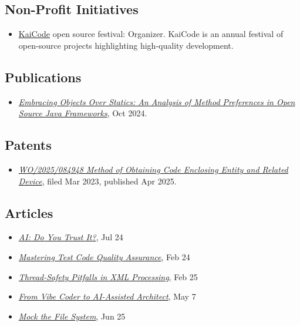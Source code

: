 \documentclass{vl}
\begin{document}
    \subsection*{Non-Profit Initiatives}
    \begin{itemize}
        \itemsep0em
        \item \href{https://www.kaicode.org}{KaiCode} open source festival: Organizer.
        KaiCode is an annual festival of open-source projects highlighting high-quality development.
    \end{itemize}

    \subsection*{Publications}
    \begin{itemize}
        \itemsep0em
        \item\emph{\href{https://arxiv.org/abs/2410.05631}{Embracing Objects Over Statics:
        An Analysis of Method Preferences
        in Open Source Java Frameworks}}, Oct 2024.
    \end{itemize}

    \subsection*{Patents}
    \begin{itemize}
        \itemsep0em
        \item\emph{\href{https://patentscope.wipo.int/search/en/detail.jsf?docId=WO2025084948&_cid=P20-ME9V9B-07633-1}{WO/2025/084948 Method of Obtaining Code Enclosing Entity and Related Device}}, filed Mar 2023, published Apr 2025.
    \end{itemize}

    \subsection*{Articles}
    \begin{itemize}
        \itemsep0em
        \item\emph{\href{https://dzone.com/articles/ai-do-you-trust-it}{AI: Do You Trust It?}}, Jul 24
        \item\emph{\href{https://dzone.com/articles/mastering-test-code-quality-assurance}{Mastering Test Code Quality
        Assurance}}, Feb 24
        \item\emph{\href{https://dzone.com/articles/thread-safety-pitfalls-in-xml-processing}{Thread-Safety Pitfalls in XML Processing}}, Feb 25
        \item\emph{\href{https://dev.to/volodya-lombrozo/from-vibe-coder-to-ai-assisted-architect-1nao}{From Vibe Coder to AI-Assisted Architect}}, May 7
        \item\emph{\href{https://dzone.com/articles/mock-the-file-system}{Mock the File System}}, Jun 25
    \end{itemize}
\end{document}

